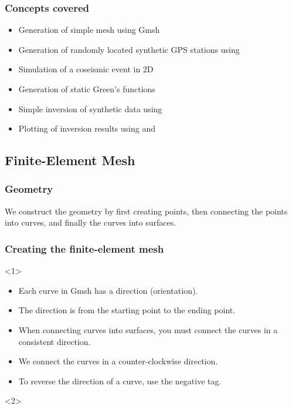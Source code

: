 \documentclass[aspectratio=169]{beamer}
\begin{document}
\begin{frame}
  \frametitle{Concepts covered}
  \summary{}

  \begin{itemize}
  \item Generation of simple mesh using Gmsh
  \item Generation of randomly located synthetic GPS stations using 
  \item Simulation of a coseismic event in 2D
  \item Generation of static Green's functions
  \item Simple inversion of synthetic data using 
  \item Plotting of inversion results using  and 
  \end{itemize}
  
\end{frame}

\subsection{Finite-Element Mesh}

\begin{frame}
  \frametitle{Geometry}
  \summary{}

  We construct the geometry by first creating points, then connecting the points into curves, and finally the curves into surfaces.
  
  
\end{frame}


\begin{frame}
  \frametitle{Creating the finite-element mesh}
  \summary{}

  \begin{onlyenv}<1>
    \begin{itemize}
    \item Each curve in Gmsh has a direction (orientation).
    \item The direction is from the starting point to the ending point.
    \item When connecting curves into surfaces, you must connect the curves in a consistent direction.
    \item We connect the curves in a counter-clockwise direction.
    \item To reverse the direction of a curve, use the negative tag.
    \end{itemize}
  \end{onlyenv}
  \begin{onlyenv}<2>
  \end{onlyenv}
  
\end{frame}
\end{document}
